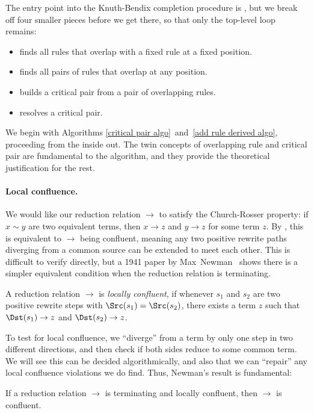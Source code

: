 \documentclass[../generics]{subfiles}
\begin{document}
The entry point into the Knuth-Bendix completion procedure is , but we break off four smaller pieces before we get there, so that only the top-level loop remains:
\begin{itemize}
\item {} finds all rules that overlap with a fixed rule at a fixed position.
\item {} finds all pairs of rules that overlap at any position.
\item {} builds a critical pair from a pair of overlapping rules.
\item {} resolves a critical pair.
\end{itemize}
We begin with Algorithms \ref{critical pair algo}~and~\ref{add rule derived algo}, proceeding from the inside out. The twin concepts of overlapping rule and critical pair are fundamental to the algorithm, and they provide the theoretical justification for the rest.

\paragraph{Local confluence.} We would like our reduction relation $\rightarrow$ to satisfy the Church-Rosser property: if $x\sim y$ are two equivalent terms, then $x\rightarrow z$ and $y\rightarrow z$ for some term $z$. By , this is equivalent to $\rightarrow$ being confluent, meaning any two positive rewrite paths diverging from a common source can be extended to meet each other. This is difficult to verify directly, but a 1941 paper by Max~Newman~\cite{newman} shows there is a simpler equivalent condition when the reduction relation is terminating.
\begin{definition}
A reduction relation $\rightarrow$ is \emph{locally confluent}, if whenever $s_1$ and $s_2$ are two positive rewrite steps with $\Src(s_1)=\Src(s_2)$, there exists a term $z$ such that $\Dst(s_1)\rightarrow z$ and $\Dst(s_2)\rightarrow z$.
\end{definition}
To test for local confluence, we ``diverge'' from a term by only one step in two different directions, and then check if both sides reduce to some common term. We will see this can be decided algorithmically, and also that we can ``repair'' any local confluence violations we do find. Thus, Newman's result is fundamental:
\begin{theorem}
If a reduction relation $\rightarrow$ is terminating and locally confluent, then $\rightarrow$ is confluent.
\end{theorem}
\end{document}
